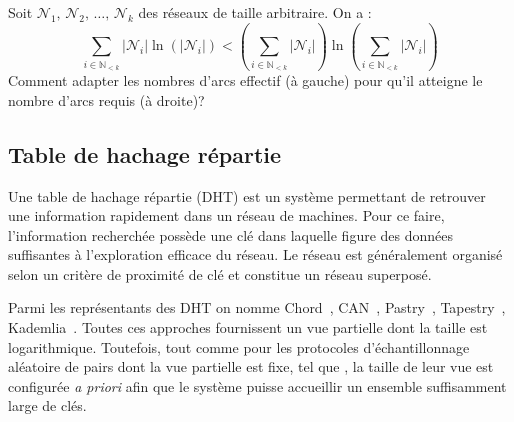 \begin{problem}
  Soit $\mathcal{N}_1,\, \mathcal{N}_2,\, \ldots ,\, \mathcal{N}_k$ des réseaux
  de taille arbitraire. On a :
\begin{equation}
  \sum\limits_{i \in \mathbb{N}_{<k}} |\mathcal{N}_i|\ln (|\mathcal{N}_i|) < (\sum\limits_{i \in \mathbb{N}_{<k}} |\mathcal{N}_i|)\ln{(\sum\limits_{i \in \mathbb{N}_{<k}} |\mathcal{N}_i|)}
\end{equation}
Comment adapter les nombres d'arcs effectif (à gauche) pour qu'il atteigne le
nombre d'arcs requis (à droite)?
\end{problem}



\subsection{Table de hachage répartie}

Une table de hachage répartie (DHT) est un système permettant de retrouver une
information rapidement dans un réseau de machines. Pour ce faire, l'information
recherchée possède une clé dans laquelle figure des données suffisantes à
l'exploration efficace du réseau. Le réseau est généralement organisé selon un
critère de proximité de clé et constitue un réseau superposé. 

Parmi les représentants des DHT on nomme Chord~\cite{stoica2001chord},
CAN~\cite{ratnasamy2001scalable}, Pastry~\cite{rowstron2001pastry},
Tapestry~\cite{zhao2006tapestry}, Kademlia~\cite{maymounkov2002kademlia}.
Toutes ces approches fournissent un vue partielle dont la taille est
logarithmique. Toutefois, tout comme pour les protocoles d'échantillonnage
aléatoire de pairs dont la vue partielle est fixe, tel que \CYCLON, la taille de
leur vue est configurée \emph{a priori} afin que le système puisse accueillir un
ensemble suffisamment large de clés.

